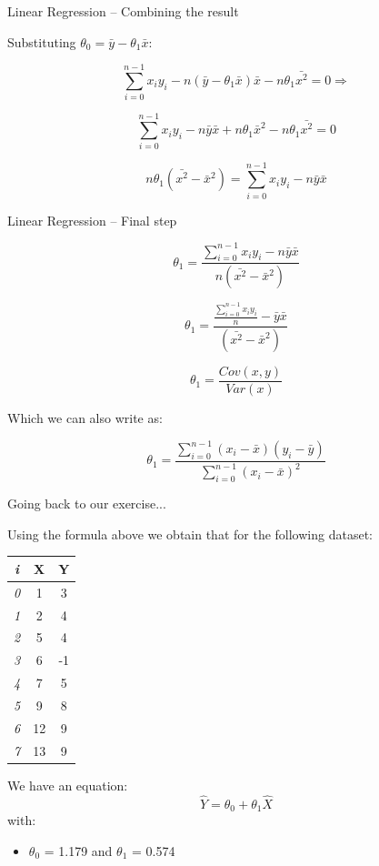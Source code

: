 \documentclass{beamer}
\begin{document}
\begin{frame}
{\centerline{Linear Regression -- Combining the result}}

Substituting $ \theta_0  = \bar{y} - \theta_1 \bar{x} $:

$$ \sum_{i=0}^{n-1}x_iy_i - n (\bar{y} - \theta_1 \bar{x}) \bar{x}  - n \theta_1 \bar{x^2} = 0 \Rightarrow $$

$$ \sum_{i=0}^{n-1}x_i y_i - n \bar{y}\bar{x} + n \theta_1 \bar{x}^2  - n \theta_1 \bar{x^2} = 0$$

$$ n \theta_1 (\bar{x^2}  - \bar{x}^2 ) = \sum_{i=0}^{n-1}x_i y_i - n \bar{y}\bar{x} $$
\end{frame}

\begin{frame}
{\centerline{Linear Regression -- Final step}}

$$ \theta_1  = \frac {\sum_{i=0}^{n-1}x_i y_i - n \bar{y}\bar{x}} {n (\bar{x^2}  - \bar{x}^2 ) } $$
\vspace*{0.2cm}

$$ \theta_1  = \frac { \frac {\sum_{i=0}^{n-1}x_i y_i}{n}  - \bar{y}\bar{x}} { (\bar{x^2}  - \bar{x}^2 ) } $$
\vspace*{0.2cm}

$$ \theta_1  = \frac { Cov(x,y)} { Var(x) } $$

Which we can also write as:

$$\theta_1 = \frac{\sum_{i=0}^{n-1}(x_i-\bar{x})(y_i-\bar{y})}{\sum_{i=0}^{n-1}(x_i-\bar{x})^2}$$


\end{frame}

\begin{frame}
{\centerline{Going back to our exercise... }}

Using the formula above we obtain that for the following dataset:

\begin{table}[h!]
\small
  \begin{center}
    \begin{tabular}{|c|c|c|}      
    \toprule
         \textit{i} & \textbf{X} & \textbf{Y} \\
    \midrule    \midrule
	\textit{0} &1 & 3 \\
	\textit{1} &2 & 4 \\
	\textit{2} &5 & 4 \\
	\textit{3} &6 & -1 \\
	\textit{4} &7 & 5 \\
	\textit{5} &9 & 8 \\
	\textit{6} &12 & 9 \\
	\textit{7} &13 & 9 \\ \bottomrule
    \end{tabular}
  \end{center}
\end{table}


We have an equation:
$$ \hat{Y} = \theta_0 + \theta_1 \hat{X} $$
with:
\begin{itemize}
\item $\theta_0$ = 1.179 and  $\theta_1$ = 0.574

\end{itemize}

\end{frame}
\end{document}
